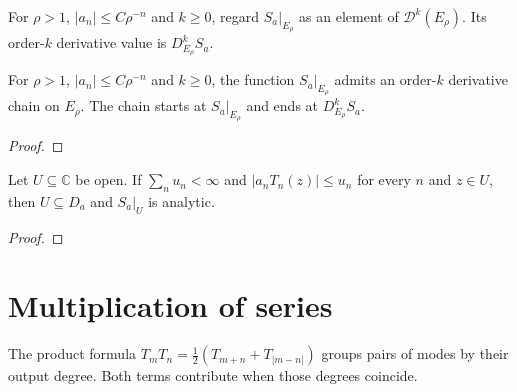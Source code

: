 \begin{supporting}

\begin{definition}
\label{def:chebyshev-series-derivative-input}
\leanok
For $\rho>1$, $|a_n|\le C\rho^{-n}$ and $k\ge0$, regard $S_a|_{E_\rho}$
as an element of $\mathcal D^k(E_\rho)$. Its order-$k$ derivative value is
$D_{E_\rho}^kS_a$.
\end{definition}

\begin{theorem}
\label{thm:chebyshev-series-derivative-input}
\leanok
For $\rho>1$, $|a_n|\le C\rho^{-n}$ and $k\ge0$, the function
$S_a|_{E_\rho}$ admits an order-$k$ derivative chain on $E_\rho$.
The chain starts at $S_a|_{E_\rho}$ and ends at $D_{E_\rho}^kS_a$.
\end{theorem}
\begin{proof}
\leanok
\end{proof}

\begin{theorem}
\label{thm:normal-chebyshev-domain}
\leanok
Let $U\subseteq\mathbb C$ be open. If $\sum_n u_n<\infty$ and
$|a_nT_n(z)|\le u_n$ for every $n$ and $z\in U$, then $U\subseteq D_a$
and $S_a|_U$ is analytic.
\end{theorem}
\begin{proof}
\leanok
\end{proof}

\end{supporting}

\section{Multiplication of series}\label{sec:textbook-calculus-products}

The product formula $T_mT_n=\tfrac12(T_{m+n}+T_{|m-n|})$ groups pairs of modes by their output degree. Both terms contribute when those degrees coincide.

